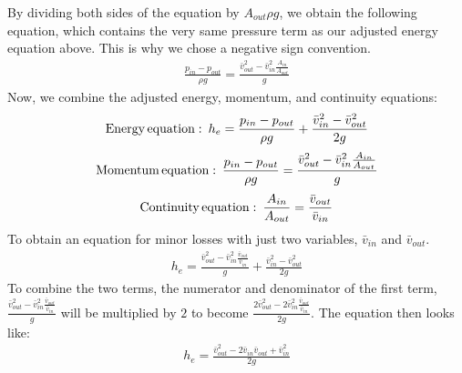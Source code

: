 \documentclass[letterpaper,10pt,english]{sphinxmanual}
\begin{document}
By dividing both sides of the equation by \(A_{out} \rho g\), we obtain the following equation, which contains the very same pressure term as our adjusted energy equation above. This is why we chose a negative sign convention.
\begin{equation}\label{equation:Fluids_Review/Fluids_Review_Derivations:Fluids_Review/Fluids_Review_Derivations:6}
\begin{split}\frac{p_{in} - p_{out}}{\rho g} = \frac{\bar v_{out}^2 - \bar v_{in}^2 \frac{A_{in}}{A_{out}}}{g}\end{split}
\end{equation}
Now, we combine the adjusted energy, momentum, and continuity equations:
\begin{equation}\label{equation:Fluids_Review/Fluids_Review_Derivations:Fluids_Review/Fluids_Review_Derivations:7}
\begin{split}{\rm{Energy \, equation:}} \,\,\,  h_e = \frac{p_{in} - p_{out}}{\rho g} + \frac{\bar v_{in}^2 - \bar v_{out}^2}{2g}\end{split}
\end{equation}\begin{equation}\label{equation:Fluids_Review/Fluids_Review_Derivations:Fluids_Review/Fluids_Review_Derivations:8}
\begin{split}{\rm{Momentum \, equation:}} \,\,\, \frac{p_{in} - p_{out}}{\rho g} = \frac{\bar v_{out}^2 - \bar v_{in}^2 \frac{A_{in}}{A_{out}}}{g}\end{split}
\end{equation}\begin{equation}\label{equation:Fluids_Review/Fluids_Review_Derivations:Fluids_Review/Fluids_Review_Derivations:9}
\begin{split}{\rm{Continuity \, equation:}} \,\,\, \frac{A_{in}}{A_{out}} = \frac{\bar v_{out}}{\bar v_{in}}\end{split}
\end{equation}
To obtain an equation for minor losses with just two variables, \(\bar v_{in}\) and \(\bar v_{out}\).
\begin{equation}\label{equation:Fluids_Review/Fluids_Review_Derivations:Fluids_Review/Fluids_Review_Derivations:10}
\begin{split}h_e = \frac{\bar v_{out}^2 - \bar v_{in}^2\frac{\bar v_{out}}{\bar v_{in}}}{g} + \frac{\bar v_{in}^2 - \bar v_{out}^2}{2g}\end{split}
\end{equation}
To combine the two terms, the numerator and denominator of the first term, \(\frac{\bar v_{out}^2 - \bar v_{in}^2\frac{\bar v_{out}}{\bar v_{in}}}{g}\) will be multiplied by \(2\) to become \(\frac{2 \bar v_{out}^2 - 2 \bar v_{in}^2\frac{\bar v_{out}}{\bar v_{in}}}{2 g}\). The equation then looks like:
\begin{equation}\label{equation:Fluids_Review/Fluids_Review_Derivations:Fluids_Review/Fluids_Review_Derivations:11}
\begin{split}h_e = \frac{\bar v_{out}^2 - 2 \bar v_{in} \bar v_{out} + \bar v_{in}^2}{2g}\end{split}
\end{equation}
\end{document}
